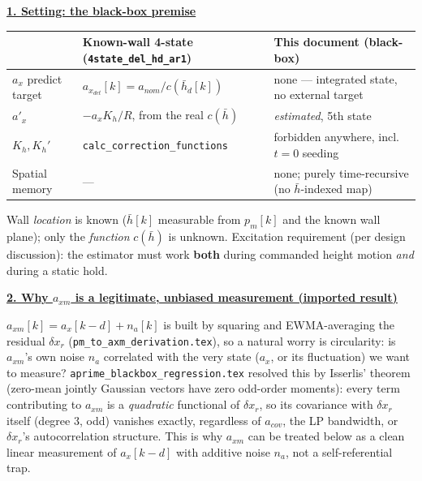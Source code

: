 \documentclass[11pt,a4paper,fontset=none]{ctexart}
\newcommand{\dxr}{\delta x_r}
\newcommand{\hd}[1]{\par\medskip\noindent\underline{\textbf{#1}}\par\nobreak\vspace{0.3ex}}
\begin{document}
\hd{1. Setting: the black-box premise}
\begin{center}
\begin{tabular}{@{}p{3.0cm}p{6.2cm}p{6.4cm}@{}}
\toprule
 & \textbf{Known-wall 4-state} (\texttt{4state\_del\_hd\_ar1}) & \textbf{This document (black-box)} \\
\midrule
$a_x$ predict target & $a_{x_{det}}[k]=a_{nom}/c(\bar h_d[k])$ & none --- integrated state, no external target \\
$a'_x$ & $-a_x K_h/R$, from the real $c(\bar h)$ & \textit{estimated}, 5th state \\
$K_h,K_h'$ & \texttt{calc\_correction\_functions} & forbidden anywhere, incl.\ $t{=}0$ seeding \\
Spatial memory & --- & none; purely time-recursive (no $\bar h$-indexed map) \\
\bottomrule
\end{tabular}
\end{center}
Wall \emph{location} is known ($\bar h[k]$ measurable from $p_m[k]$ and the known wall plane); only the \emph{function} $c(\bar h)$ is unknown. Excitation requirement (per design discussion): the estimator must work \textbf{both} during commanded height motion \emph{and} during a static hold.

\hd{2. Why $a_{xm}$ is a legitimate, unbiased measurement (imported result)}
$a_{xm}[k] = a_x[k-d]+n_a[k]$ is built by squaring and EWMA-averaging the residual $\dxr$ (\texttt{pm\_to\_axm\_derivation.tex}), so a natural worry is circularity: is $a_{xm}$'s own noise $n_a$ correlated with the very state ($a_x$, or its fluctuation) we want to measure? \texttt{aprime\_blackbox\_regression.tex} resolved this by Isserlis' theorem (zero-mean jointly Gaussian vectors have zero odd-order moments): every term contributing to $a_{xm}$ is a \emph{quadratic} functional of $\dxr$, so its covariance with $\dxr$ itself (degree 3, odd) vanishes exactly, regardless of $a_{cov}$, the LP bandwidth, or $\dxr$'s autocorrelation structure. This is why $a_{xm}$ can be treated below as a clean linear measurement of $a_x[k-d]$ with additive noise $n_a$, not a self-referential trap.
\end{document}
